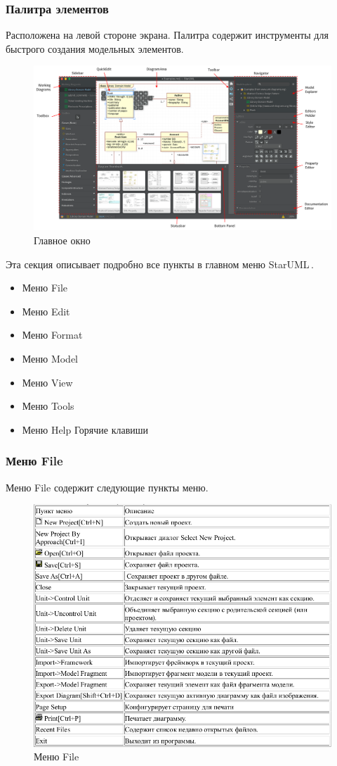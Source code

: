 \documentclass[a4paper,12pt]{extreport}
\newcommand{\staruml}{StarUML\,\tm}
\begin{document}
\subsubsection*{Палитра элементов}
Расположена на левой стороне экрана. Палитра содержит инструменты для быстрого создания
модельных элементов.
\begin{figure}[htbp]
	\centering
	\includegraphics[width=0.8\linewidth]{images/mainwindow}
	\caption{Главное окно}
	\label{fig:mainwindow}
\end{figure}
\newpage
{}
Эта секция описывает подробно все пункты в главном меню \staruml.
\begin{itemize}
	\item Меню File
	\item Меню Edit
	\item Меню Format
	\item Меню Model
	\item Меню View
	\item Меню Tools
	\item Меню Help
	Горячие клавиши
\end{itemize}
\subsubsection*{Меню File}
Меню File содержит следующие пункты меню.
\begin{figure}[h!]
	\centering
	\includegraphics[width=0.8\linewidth]{images/filemenu}
	\caption{Меню File}
	\label{fig:filemenu}
\end{figure}
\newpage
\end{document}
